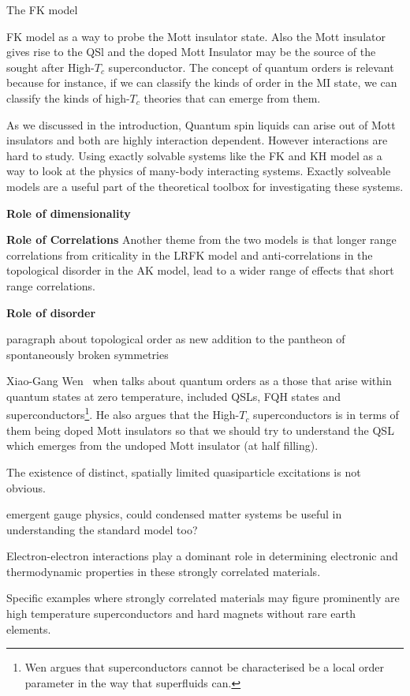 The FK model

FK model as a way to probe the Mott insulator state. Also the Mott insulator gives rise to the QSl and the doped Mott Insulator may be the source of the sought after High-\(T_c\) superconductor. The concept of quantum orders is relevant because for instance, if we can classify the kinds of order in the MI state, we can classify the kinds of high-\(T_c\) theories that can emerge from them.

As we discussed in the introduction, Quantum spin liquids can arise out of Mott insulators and both are highly interaction dependent. However interactions are hard to study. Using exactly solvable systems like the FK and KH model as a way to look at the physics of many-body interacting systems. Exactly solveable models are a useful part of the theoretical toolbox for investigating these systems.

\textbf{Role of dimensionality}

\textbf{Role of Correlations} Another theme from the two models is that longer range correlations from criticality in the LRFK model and anti-correlations in the topological disorder in the AK model, lead to a wider range of effects that short range correlations.

\textbf{Role of disorder}

paragraph about topological order as new addition to the pantheon of spontaneously broken symmetries

Xiao-Gang Wen~\autocite{wenQuantumOrdersSymmetric2002} when talks about quantum orders as a those that arise within quantum states at zero temperature, included QSLs, FQH states and superconductors\footnote{Wen argues that superconductors cannot be characterised be a local order parameter in the way that superfluids can.}. He also argues that the High-\(T_c\) superconductors is in terms of them being doped Mott insulators so that we should try to understand the QSL which emerges from the undoped Mott insulator (at half filling).

The existence of distinct, spatially limited quasiparticle excitations is not obvious.

emergent gauge physics, could condensed matter systems be useful in understanding the standard model too?

Electron-electron interactions play a dominant role in determining electronic and thermodynamic properties in these strongly correlated materials.

Specific examples where strongly correlated materials may figure prominently are high temperature superconductors and hard magnets without rare earth elements.

